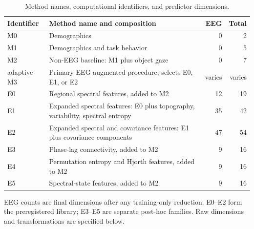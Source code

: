 \begin{table}[!htbp]
\centering\small
\caption{Method names, computational identifiers, and predictor dimensions.}
\label{tab:crosswalk}
\begin{tabularx}{\textwidth}{@{}l>{\raggedright\arraybackslash}Xrr@{}}
\toprule
Identifier & Method name and composition & EEG & Total\\
\midrule
M0 & Demographics & 0 & 2\\
M1 & Demographics and task behavior & 0 & 5\\
M2 & Non-EEG baseline: M1 plus object gaze & 0 & 7\\
adaptive M3 & Primary EEG-augmented procedure; selects E0, E1, or E2 & varies & varies\\
E0 & Regional spectral features, added to M2 & 12 & 19\\
E1 & Expanded spectral features: E0 plus topography, variability, spectral entropy & 35 & 42\\
E2 & Expanded spectral and covariance features: E1 plus covariance components & 47 & 54\\
E3 & Phase-lag connectivity, added to M2 & 9 & 16\\
E4 & Permutation entropy and Hjorth features, added to M2 & 9 & 16\\
E5 & Spectral-state features, added to M2 & 9 & 16\\
\bottomrule
\end{tabularx}
\par\smallskip\footnotesize EEG counts are final dimensions after any training-only reduction. E0--E2 form the preregistered library; E3--E5 are separate post-hoc families. Raw dimensions and transformations are specified below.
\end{table}
